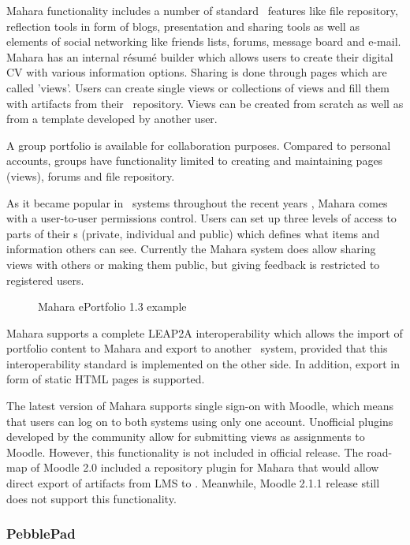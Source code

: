 Mahara functionality includes a number of standard \ep~features like file
repository, reflection tools in form of blogs, presentation and sharing tools as
well as elements of social networking like friends lists, forums, message board
and e-mail. Mahara has an internal r\'{e}sum\'{e} builder which allows users to
create their digital CV with various information options. Sharing is done
through pages which are called 'views'. Users can create single views or
collections of views and fill them with artifacts from their \ep~repository.
Views can be created from scratch as well as from a template developed by
another user.

A group portfolio is available for collaboration purposes. Compared to personal
accounts, groups have functionality limited to creating and maintaining pages
(views), forums and file repository.

As it became popular in \ep~systems throughout the recent years
\citep{Waters2009}, Mahara comes with a user-to-user permissions control. Users
can set up three levels of access to parts of their \ep s (private, individual
and public) which defines what items and information others can see. Currently
the Mahara system does allow sharing views with others or making them public,
but giving feedback is restricted to registered users.

\begin{figure}[htb]
\centering
\setlength\fboxsep{0pt}
\setlength\fboxrule{0.5pt}
\caption{Mahara ePortfolio 1.3 example}
\label{fig:maharaep}
\end{figure}

Mahara supports a complete LEAP2A interoperability which allows the import of
portfolio content to Mahara and export to another \ep~system, provided that
this interoperability standard is implemented on the other side. In addition,
export in form of static HTML pages is supported.

The latest version of Mahara supports single sign-on with Moodle, which means
that users can log on to both systems using only one account. Unofficial plugins
developed by the community allow for submitting views as assignments to Moodle.
However, this functionality is not included in official release. The road-map of
Moodle 2.0 included a repository plugin for Mahara that would allow direct
export of artifacts from LMS to \ep. Meanwhile, Moodle 2.1.1 release still does
not support this functionality.

\subsubsection{PebblePad}

